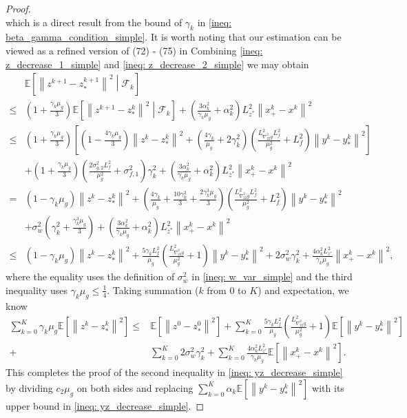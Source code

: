 \documentclass[10pt]{article}
\theoremstyle{remark}
\def\setF{\mathscr{F}} %
\newcommand{\E}{\mathbb{E}}
\newcommand{\norm}[1]{\left\|#1\right\|}
\begin{document}
\begin{proof}
\[\]
which is a direct result from the bound of $\gamma_k$ in \eqref{ineq: beta_gamma_condition_simple}. It is worth noting that our estimation can be viewed as a refined version of (72) - (75) in \cite{dagreou2022framework}
Combining \eqref{ineq: z_decrease_1_simple} and \eqref{ineq: z_decrease_2_simple} we may obtain
{\small
\begin{align*}
    &\E\left[\norm{z^{k+1} - z_*^{k+1}}^2\middle|\setF_k\right] \\
    \leq &\left(1 + \frac{\gamma_k\mu_g}{3}\right)\E\left[\norm{z^{k+1} - z_*^k}^2\middle|\setF_k\right] + \left(\frac{3\alpha_k^2}{\gamma_k\mu_g} + \alpha_k^2 \right)L_{z^*}^2\norm{x_+^k - x^k}^2\\
    \leq &\left(1 + \frac{\gamma_k\mu_g}{3}\right)\left[\left(1 - \frac{4\gamma_k\mu_g}{3}\right)\norm{z^k-z_*^k}^2 + \left(\frac{4\gamma_k}{\mu_g} + 2\gamma_k^2\right)\left(\frac{L_{\nabla_{22}^2g}^2L_f^2}{\mu_g^2} + L_f^2\right)\norm{y^k - y_*^k}^2\right] \\
     & + \left(1 + \frac{\gamma_k\mu_g}{3}\right)\left(\frac{2\sigma_{g,2}^2L_f^2}{\mu_g^2} + \sigma_{f,1}^2\right)\gamma_k^2 + \left(\frac{3\alpha_k^2}{\gamma_k\mu_g} + \alpha_k^2 \right)L_{z^*}^2\norm{x_+^k - x^k}^2 \\
    = &\left(1 - \gamma_k\mu_g\right)\norm{z^k-z_*^k}^2 + \left(\frac{4\gamma_k}{\mu_g} + \frac{10\gamma_k^2}{3} + \frac{2\gamma_k^3\mu_g}{3}\right)\left(\frac{L_{\nabla_{22}^2g}^2L_f^2}{\mu_g^2} + L_f^2\right)\norm{y^k - y_*^k}^2 \\
     & + \sigma_w^2\left(\gamma_k^2  + \frac{\gamma_k^3\mu_g}{3}\right) + \left(\frac{3\alpha_k^2}{\gamma_k\mu_g} + \alpha_k^2 \right)L_{z^*}^2\norm{x_+^k - x^k}^2 \\
    \leq &\left(1 - \gamma_k\mu_g\right)\norm{z^k-z_*^k}^2 + \frac{5\gamma_kL_f^2}{\mu_g}\left(\frac{L_{\nabla_{22}^2g}^2}{\mu_g^2} + 1\right)\norm{y^k - y_*^k}^2 + 2\sigma_w^2\gamma_k^2 + \frac{4\alpha_k^2L_{z^*}^2}{\gamma_k\mu_g}\norm{x_+^k - x^k}^2,
\end{align*}
}%
where the equality uses the definition of $\sigma_w^2$ in \eqref{ineq: w_var_simple} and the third inequality uses $\gamma_k\mu_g \leq \frac{1}{4}$. Taking summation ($k$ from $0$ to $K$) and expectation, we know 
\begin{align*}
    \sum_{k=0}^{K}\gamma_k\mu_g\E\left[\norm{z^k-z_*^k}^2\right] \leq &\E\left[\norm{z^0 - z_*^0}^2\right]+ \sum_{k=0}^{K}\frac{5\gamma_kL_f^2}{\mu_g}\left(\frac{L_{\nabla_{22}^2g}^2}{\mu_g^2} + 1\right) \E\left[\norm{y^k - y_*^k}^2\right] \\
        + &\sum_{k=0}^{K}2\sigma_w^2\gamma_k^2 + \sum_{k=0}^{K}\frac{4\alpha_k^2L_{z^*}^2}{\gamma_k\mu_g}\E\left[\norm{x_+^k - x^k}^2\right].
\end{align*}
This completes the proof of the second inequality in \eqref{ineq: yz_decrease_simple} by dividing $c_2\mu_g$ on both sides and replacing $\sum_{k=0}^{K}\alpha_k\E\left[\norm{y^k - y_*^k}^2\right]$ with its upper bound in \eqref{ineq: yz_decrease_simple}.
\end{proof}
\end{document}
